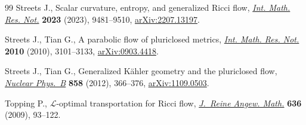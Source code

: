 \documentclass[pdftex]{sigma}
\numberwithin{equation}{section}
\begin{document}
\begin{thebibliography}{99}
Streets J., Scalar curvature, entropy, and generalized {R}icci flow,
 \href{https://doi.org/10.1093/imrn/rnad002}{\textit{Int. Math. Res. Not.}} \textbf{2023} (2023), 9481--9510,
 \href{https://arxiv.org/abs/2207.13197}{arXiv:2207.13197}.

Streets J., Tian G., A parabolic flow of pluriclosed metrics, \href{https://doi.org/10.1093/imrn/rnp237}{\textit{Int.
 Math. Res. Not.}} \textbf{2010} (2010), 3101--3133, \href{https://arxiv.org/abs/0903.4418}{arXiv:0903.4418}.

Streets J., Tian G., Generalized {K}\"ahler geometry and the pluriclosed flow,
 \href{https://doi.org/10.1016/j.nuclphysb.2012.01.008}{\textit{Nuclear Phys.~B}} \textbf{858} (2012), 366--376, \href{https://arxiv.org/abs/1109.0503}{arXiv:1109.0503}.

Topping P., {$\mathcal L$}-optimal transportation for {R}icci flow,
 \href{https://doi.org/10.1515/CRELLE.2009.083}{\textit{J.~Reine Angew. Math.}} \textbf{636} (2009), 93--122.

\end{thebibliography}\LastPageEnding
\end{document}
